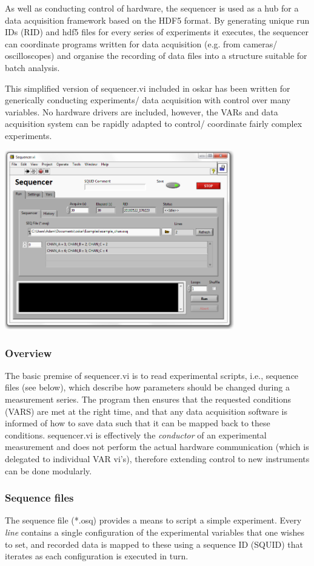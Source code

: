 \documentclass[10pt,a4paper]{article}
\begin{document}
As well as conducting control of hardware, the sequencer is used as a hub for a data acquisition framework based on the HDF5 format.  By generating unique run IDs (RID) and hdf5 files for every series of experiments it executes, the sequencer can coordinate programs written for data acquisition (e.g. from cameras/ oscilloscopes) and organise the recording of data files into a structure suitable for batch analysis.

This simplified version of sequencer.vi included in oskar has been written for generically conducting experiments/ data acquisition with control over many variables.   No hardware drivers are included, however, the VARs and data acquisition system can be rapidly adapted to control/ coordinate fairly complex experiments.

\includegraphics[width=0.75\textwidth]{images/sequencer.png}

\subsubsection{Overview}

The basic premise of sequencer.vi is to read experimental scripts, i.e., sequence files (see below), which describe how parameters should be changed during a measurement series.  The program then ensures that the requested conditions (VARS) are met at the right time, and that any data acquisition software is informed of how to save data such that it can be mapped back to these conditions.  sequencer.vi is effectively the \emph{conductor} of an experimental measurement and does not perform the actual hardware communication (which is delegated to individual VAR vi's), therefore extending control to new instruments can be done modularly.

\subsubsection{Sequence files}
The sequence file (*.osq) provides a means to script a simple experiment. Every \emph{line} contains a single configuration of the experimental variables that one wishes to set, and recorded data is mapped to these using a sequence ID (SQUID) that iterates as each configuration is executed in turn.
\end{document}

